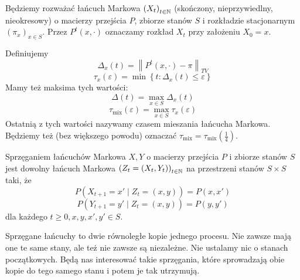 Będziemy rozważać łańcuch Markowa \(\left( X_t \right) _{t \in \mathbb{N}}\) (skończony, nieprzywiedlny, nieokresowy) o macierzy przejścia \(P\), zbiorze stanów \(S\) i rozkładzie stacjonarnym \(\left( \pi_x \right) _{x \in S}\). Przez \(P^{t}\left( x, \cdot \right) \) oznaczamy rozkład \(X_t\) przy założeniu \(X_0 = x \).

\begin{definition}
	Definiujemy
	\[\Delta_x\left( t  \right) = \left\|P^{t}\left( x, \cdot  \right) - \pi\right\|_{TV}\]
	\[\tau_x\left( \varepsilon  \right) = \min \left\{ t : \Delta_x\left( t  \right) \le \varepsilon  \right\} \]
	Mamy też maksima tych wartości:
	\[\Delta\left( t  \right) = \max_{x \in S} \Delta_x\left( t  \right) \]
	\[\tau_{\mathrm{mix}}\left( \varepsilon  \right) = \max_{x \in S} \tau_x\left( \varepsilon  \right)\]
	Ostatnią z tych wartości nazywamy czasem mieszania łańcucha Markowa. Będziemy też (bez większego powodu) oznaczać \(\tau_{\mathrm{mix}} = \tau_{\mathrm{mix}}\left( \frac{1}{4} \right) \).
\end{definition}

\begin{definition}
	Sprzęganiem łańcuchów Markowa \(X,Y\) o macierzy przejścia \(P\) i zbiorze stanów \(S\) jest dowolny łańcuch Markowa \(\left( Z_t = \left( X_t, Y_t \right)  \right) _{t \in \mathbb{N}}\) na przestrzeni stanów \(S \times S\) taki, że
	\[ P\left( X_{t+1} = x' \mid Z_t = \left( x,y \right)  \right) = P\left( x,x' \right)  \]
	\[ P\left( Y_{t+1} = y' \mid Z_t = \left( x,y \right)  \right) = P\left( y, y' \right)  \]
	dla każdego \(t\ge 0, x,y,x',y' \in S\).

	Sprzęgane łańcuchy to dwie równoległe kopie jednego procesu. Nie zawsze mają one te same stany, ale też nie zawsze są niezależne. Nie ustalamy nic o stanach początkowych. Będą nas interesować takie sprzęgania, które sprowadzają obie kopie do tego samego stanu i potem je tak utrzymują.
\end{definition}

